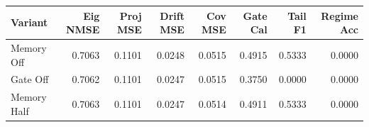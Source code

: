 \begin{tabular}{lrrrrrrr}
\toprule
Variant & Eig NMSE & Proj MSE & Drift MSE & Cov MSE & Gate Cal & Tail F1 & Regime Acc \\
\midrule
Memory Off & 0.7063 & 0.1101 & 0.0248 & 0.0515 & 0.4915 & 0.5333 & 0.0000 \\
Gate Off & 0.7062 & 0.1101 & 0.0247 & 0.0515 & 0.3750 & 0.0000 & 0.0000 \\
Memory Half & 0.7063 & 0.1101 & 0.0247 & 0.0514 & 0.4911 & 0.5333 & 0.0000 \\
\bottomrule
\end{tabular}